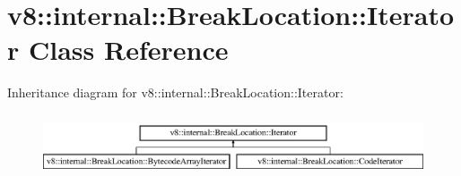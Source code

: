 \hypertarget{classv8_1_1internal_1_1_break_location_1_1_iterator}{}\section{v8\+:\+:internal\+:\+:Break\+Location\+:\+:Iterator Class Reference}
\label{classv8_1_1internal_1_1_break_location_1_1_iterator}
Inheritance diagram for v8\+:\+:internal\+:\+:Break\+Location\+:\+:Iterator\+:\begin{figure}[H]
\begin{center}
\leavevmode
\includegraphics[height=1.860465cm]{classv8_1_1internal_1_1_break_location_1_1_iterator}
\end{center}
\end{figure}
